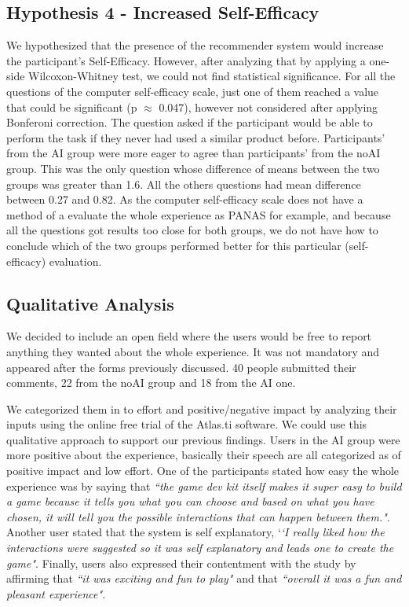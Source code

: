 \documentclass[letterpaper]{article} %
\begin{document}
\subsection{Hypothesis 4 - Increased Self-Efficacy}
We hypothesized that the presence of the recommender system would increase the participant's Self-Efficacy. However, after analyzing that by applying a one-side Wilcoxon-Whitney test, we could not find statistical significance. For all the questions of the computer self-efficacy scale, just one of them reached a value that could be significant (p $\approx$ 0.047), however not considered after applying Bonferoni correction. The question asked if the participant would be able to perform the task if they never had used a similar product before. Participants' from the AI group were more eager to agree than participants' from the noAI group. This was the only question whose difference of means between the two groups was greater than 1.6. All the others questions had mean difference between 0.27 and 0.82. As the computer self-efficacy scale does not have a method of a evaluate the whole experience as PANAS for example, and because all the questions got results too close for both groups, we do not have how to conclude which of the two groups performed better for this particular (self-efficacy) evaluation.

\subsection{Qualitative Analysis}
We decided to include an open field where the users would be free to report anything they wanted about the whole experience. It was not mandatory and appeared after the forms previously discussed. 40 people submitted their comments, 22 from the noAI group and 18 from the AI one.

We categorized them in to effort and positive/negative impact by analyzing their inputs using the online free trial of the Atlas.ti software. We could use this qualitative approach to support our previous findings. Users in the AI group were more positive about the experience, basically their speech are all categorized as of positive impact and low effort. One of the participants stated how easy the whole experience was by saying that \textit{``the game dev kit itself makes it super easy to build a game because it tells you what you can choose and based on what you have chosen, it will tell you the possible interactions that can happen between them."}. Another user stated that the system is self explanatory, `\textit{`I really liked how the interactions were suggested so it was self explanatory and leads one to create the game"}. Finally, users also expressed their contentment with the study by affirming that \textit{``it was exciting and fun to play"} and that \textit{``overall it was a fun and pleasant experience"}.
\end{document}
